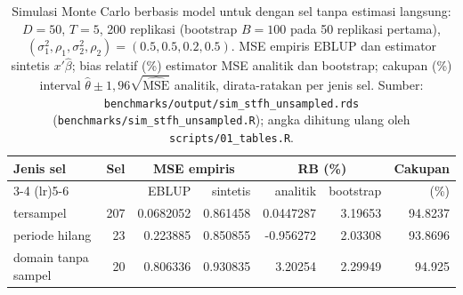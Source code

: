 \begin{table}[htbp]
\centering
\caption{Simulasi Monte Carlo berbasis model untuk  dengan sel tanpa estimasi langsung: $D=50$, $T=5$, 200 replikasi (bootstrap $B=100$ pada 50 replikasi pertama), $(\sigma_1^2,\rho_1,\sigma_2^2,\rho_2)=(0.5, 0.5, 0.2, 0.5)$. MSE empiris EBLUP dan estimator sintetis $x'\hat\beta$; bias relatif (\%) estimator MSE analitik dan bootstrap; cakupan (\%) interval $\hat\theta\pm1{,}96\sqrt{\widehat{\mathrm{MSE}}}$ analitik, dirata-ratakan per jenis sel. Sumber: \texttt{benchmarks/output/sim\_stfh\_unsampled.rds} (\texttt{benchmarks/sim\_stfh\_unsampled.R}); angka dihitung ulang oleh \texttt{scripts/01\_tables.R}.}
\label{tab:stfh-unsampled-sim}
\small
\begin{tabular}{lrrrrrr}
\toprule
Jenis sel & Sel & \multicolumn{2}{c}{MSE empiris} & \multicolumn{2}{c}{RB (\%)} & Cakupan \\
\cmidrule(lr){3-4} \cmidrule(lr){5-6}
 & & EBLUP & sintetis & analitik & bootstrap & (\%) \\
\midrule
tersampel & 207 & 0.0682052 & 0.861458 & 0.0447287 & 3.19653 & 94.8237 \\
periode hilang & 23 & 0.223885 & 0.850855 & -0.956272 & 2.03308 & 93.8696 \\
domain tanpa sampel & 20 & 0.806336 & 0.930835 & 3.20254 & 2.29949 &  94.925 \\
\bottomrule
\end{tabular}
\end{table}

